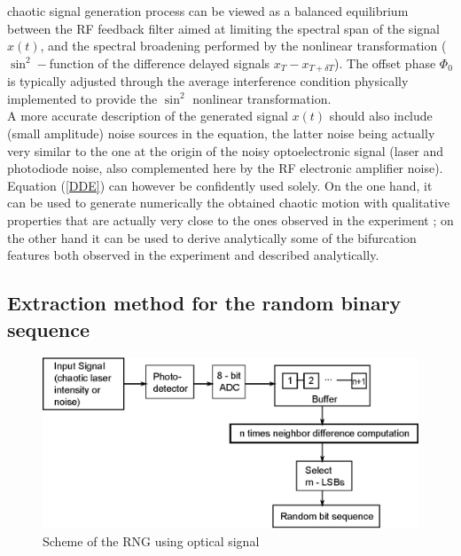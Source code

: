 chaotic signal generation process can be viewed as a balanced equilibrium between the RF feedback filter aimed at limiting the spectral span of the signal $x(t)$, and the spectral broadening performed by the nonlinear transformation ($\sin^2-$function of the difference delayed signals $x_T-x_{T+\delta T}$). The offset phase $\Phi_0$ is typically adjusted through the average interference condition physically implemented to provide the $\sin^2$ nonlinear transformation.\\
%
A more accurate description of the generated signal $x(t)$ should also include (small amplitude) noise sources in the equation, the latter noise being actually very similar to the one at the origin of the noisy optoelectronic signal (laser and photodiode noise, also complemented here by the RF electronic amplifier noise). Equation (\ref{DDE}) can however be confidently used solely. On the one hand, it can be used to generate numerically the obtained chaotic motion with qualitative properties that are actually very close to the ones observed in the experiment \cite{lavrov:pre09}; on the other hand it can be used to derive analytically some of the bifurcation features both observed in the experiment \cite{weicker:pre12} and described analytically.
%

\subsection{Extraction method for the random binary sequence}
\label{Design}

\begin{figure}
  \centering
  \includegraphics[scale=0.6]{scheme_optic.eps} %
  \hspace{0.5cm}
  \caption{Scheme of the RNG using optical signal}
  \label{derivative}
\end{figure}

